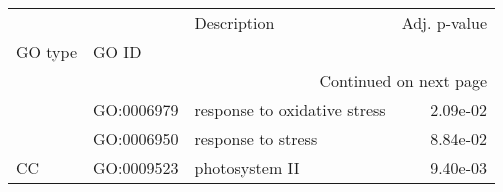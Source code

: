 \begin{longtable}{lllr}
\toprule
   &            &                   Description &  Adj. p-value \\
GO type & GO ID &                               &               \\
\midrule
\endhead
\midrule
\multicolumn{4}{r}{{Continued on next page}} \\
\midrule
\endfoot

\bottomrule
\endlastfoot
\multirow{2}{*}{BP} & GO:0006979 &  response to oxidative stress &      2.09e-02 \\
   & GO:0006950 &            response to stress &      8.84e-02 \\
\cline{1-4}
CC & GO:0009523 &                photosystem II &      9.40e-03 \\
\end{longtable}